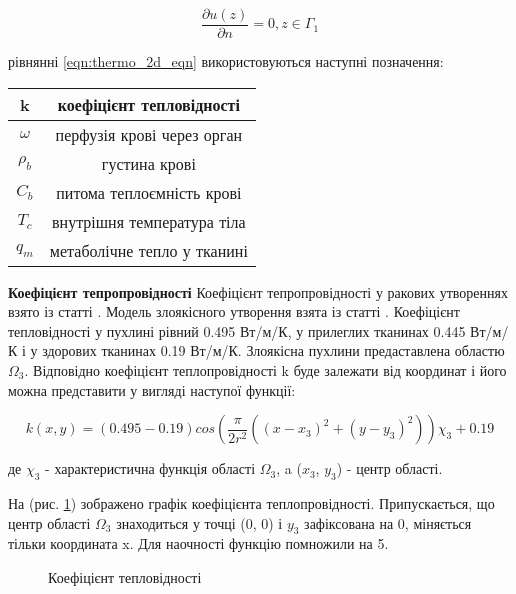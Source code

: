 \begin{equation}
    \label{eqn:thermo_2d_cond_2}
    \dfrac{\partial{u(z)}}{\partial{n}} = 0, z \in \Gamma_1
\end{equation}

 рівнянні \ref{eqn:thermo_2d_eqn} використовуються наступні позначення:

\begin{center}
    \begin{tabular}{|c|c|} 
        \hline
            k & коефіцієнт тепловідності \\
        \hline
            \(\omega\) & перфузія крові через орган \\
        \hline
            \(\rho_b\) & густина крові \\
        \hline
            \(C_b\) & питома теплоємність крові \\
        \hline
            \(T_c\) & внутрішня температура тіла \\
        \hline
            \(q_m\) & метаболічне тепло у тканині \\
        \hline
    \end{tabular}
\end{center}

\textbf{Коефіцієнт тепропровідності} Коефіцієнт тепропровідності у ракових утвореннях взято із статті 
\cite{lung-tumor-thermal-conductivity}. Модель злоякісного утворення взята із статті \cite{tumor-thermal-model}.
Коефіцієнт тепловідності у пухлині рівний 0.495 Вт/м/К, у прилеглих тканинах 0.445 Вт/м/К і у здорових тканинах 
0.19 Вт/м/К. Злоякісна пухлини предаставлена областю $\Omega_3$. Відповідно коефіцієнт теплопровідності k буде залежати
від координат і його можна представити у вигляді наступої функції:

\begin{equation}
    \label{eqn:thermo_2d_thermal_conductivity}
    k(x, y) = (0.495 - 0.19)cos(\frac{\pi}{2r^2}((x - x_3)^2 + (y - y_3)^2))\chi_3 + 0.19
\end{equation}

\noindent де $\chi_3$ - характеристична функція області $\Omega_3$, a ($x_3$, $y_3$) - центр області.

\noindent На (рис. \ref{fig:thermo_2d_thermal_conductivity}) зображено графік коефіцієнта теплопровідності. 
Припускається, що центр області $\Omega_3$ знаходиться у точці (0, 0) і $y_3$ зафіксована на 0, міняється тільки 
координата x. Для наочності функцію помножили на 5. 

\begin{figure}[ht!]
    \centering
    \caption{Коефіцієнт тепловідності}
    \label{fig:thermo_2d_thermal_conductivity}
\end{figure}

